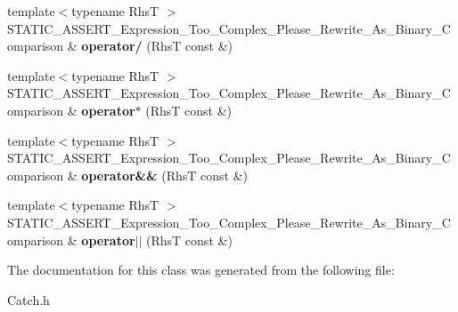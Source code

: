 \begin{DoxyCompactItemize}
\item 
\hypertarget{class_catch_1_1_expression_lhs_a37d50565046ac9b1c9159a7c0cf88a1e}{{\footnotesize template$<$typename Rhs\-T $>$ }\\S\-T\-A\-T\-I\-C\-\_\-\-A\-S\-S\-E\-R\-T\-\_\-\-Expression\-\_\-\-Too\-\_\-\-Complex\-\_\-\-Please\-\_\-\-Rewrite\-\_\-\-As\-\_\-\-Binary\-\_\-\-Comparison \& {\bfseries operator/} (Rhs\-T const \&)}\label{class_catch_1_1_expression_lhs_a37d50565046ac9b1c9159a7c0cf88a1e}

\item 
\hypertarget{class_catch_1_1_expression_lhs_a9a94294c22449f62087862ef911e6291}{{\footnotesize template$<$typename Rhs\-T $>$ }\\S\-T\-A\-T\-I\-C\-\_\-\-A\-S\-S\-E\-R\-T\-\_\-\-Expression\-\_\-\-Too\-\_\-\-Complex\-\_\-\-Please\-\_\-\-Rewrite\-\_\-\-As\-\_\-\-Binary\-\_\-\-Comparison \& {\bfseries operator$\ast$} (Rhs\-T const \&)}\label{class_catch_1_1_expression_lhs_a9a94294c22449f62087862ef911e6291}

\item 
\hypertarget{class_catch_1_1_expression_lhs_a7f022056ef4f25e716ab85846be6229f}{{\footnotesize template$<$typename Rhs\-T $>$ }\\S\-T\-A\-T\-I\-C\-\_\-\-A\-S\-S\-E\-R\-T\-\_\-\-Expression\-\_\-\-Too\-\_\-\-Complex\-\_\-\-Please\-\_\-\-Rewrite\-\_\-\-As\-\_\-\-Binary\-\_\-\-Comparison \& {\bfseries operator\&\&} (Rhs\-T const \&)}\label{class_catch_1_1_expression_lhs_a7f022056ef4f25e716ab85846be6229f}

\item 
\hypertarget{class_catch_1_1_expression_lhs_a6932b72da79d6c6b03d867772ceac61b}{{\footnotesize template$<$typename Rhs\-T $>$ }\\S\-T\-A\-T\-I\-C\-\_\-\-A\-S\-S\-E\-R\-T\-\_\-\-Expression\-\_\-\-Too\-\_\-\-Complex\-\_\-\-Please\-\_\-\-Rewrite\-\_\-\-As\-\_\-\-Binary\-\_\-\-Comparison \& {\bfseries operator$|$$|$} (Rhs\-T const \&)}\label{class_catch_1_1_expression_lhs_a6932b72da79d6c6b03d867772ceac61b}

\end{DoxyCompactItemize}


The documentation for this class was generated from the following file\-:\begin{DoxyCompactItemize}
\item 
Catch.\-h\end{DoxyCompactItemize}
